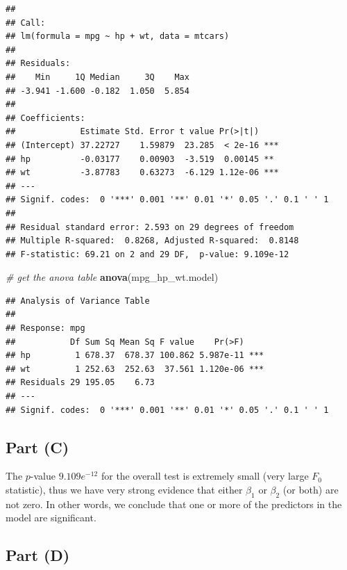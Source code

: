 \documentclass[
]{article}
\newenvironment{Shaded}{\begin{snugshade}}{\end{snugshade}}
\newcommand{\CommentTok}[1]{\textcolor[rgb]{0.56,0.35,0.01}{\textit{#1}}}
\newcommand{\FunctionTok}[1]{\textcolor[rgb]{0.13,0.29,0.53}{\textbf{#1}}}
\newcommand{\NormalTok}[1]{#1}
\begin{document}
\begin{verbatim}
## 
## Call:
## lm(formula = mpg ~ hp + wt, data = mtcars)
## 
## Residuals:
##    Min     1Q Median     3Q    Max 
## -3.941 -1.600 -0.182  1.050  5.854 
## 
## Coefficients:
##             Estimate Std. Error t value Pr(>|t|)    
## (Intercept) 37.22727    1.59879  23.285  < 2e-16 ***
## hp          -0.03177    0.00903  -3.519  0.00145 ** 
## wt          -3.87783    0.63273  -6.129 1.12e-06 ***
## ---
## Signif. codes:  0 '***' 0.001 '**' 0.01 '*' 0.05 '.' 0.1 ' ' 1
## 
## Residual standard error: 2.593 on 29 degrees of freedom
## Multiple R-squared:  0.8268, Adjusted R-squared:  0.8148 
## F-statistic: 69.21 on 2 and 29 DF,  p-value: 9.109e-12
\end{verbatim}

\begin{Shaded}
\begin{Highlighting}[]
\CommentTok{\# get the anova table}
\FunctionTok{anova}\NormalTok{(mpg\_hp\_wt.model)}
\end{Highlighting}
\end{Shaded}

\begin{verbatim}
## Analysis of Variance Table
## 
## Response: mpg
##           Df Sum Sq Mean Sq F value    Pr(>F)    
## hp         1 678.37  678.37 100.862 5.987e-11 ***
## wt         1 252.63  252.63  37.561 1.120e-06 ***
## Residuals 29 195.05    6.73                      
## ---
## Signif. codes:  0 '***' 0.001 '**' 0.01 '*' 0.05 '.' 0.1 ' ' 1
\end{verbatim}

\hypertarget{part-c-2}{%
\subsection{Part (C)}\label{part-c-2}}


The \(p\)-value \(9.109e^{-12}\) for the overall test is extremely small
(very large \(F_0\) statistic), thus we have very strong evidence that
either \(\beta_1\) or \(\beta_2\) (or both) are not zero. In other
words, we conclude that one or more of the predictors in the model are
significant.

\hypertarget{part-d-2}{%
\subsection{Part (D)}\label{part-d-2}}
\end{document}
